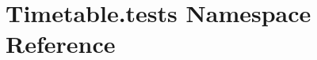 \hypertarget{namespaceTimetable_1_1tests}{}\section{Timetable.\+tests Namespace Reference}
\label{namespaceTimetable_1_1tests}
